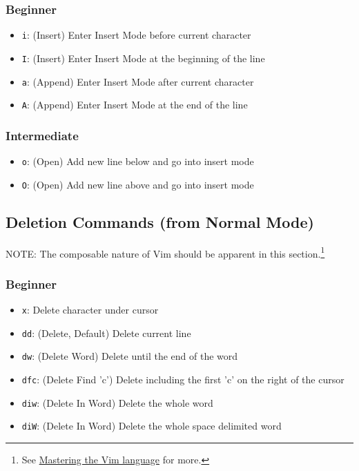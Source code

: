 \documentclass[11pt]{article}
\begin{document}
\subsubsection{Beginner}
\label{sec:org8cca391}
\begin{itemize}
\item \texttt{i}: (Insert) Enter Insert Mode before current character
\item \texttt{I}: (Insert) Enter Insert Mode at the beginning of the line
\item \texttt{a}: (Append) Enter Insert Mode after current character
\item \texttt{A}: (Append) Enter Insert Mode at the end of the line
\end{itemize}
\subsubsection{Intermediate}
\label{sec:orgb60cd62}
\begin{itemize}
\item \texttt{o}: (Open) Add new line below and go into insert mode
\item \texttt{O}: (Open) Add new line above and go into insert mode
\end{itemize}
\subsection{Deletion Commands (from Normal Mode)}
\label{sec:org8563a4f}
NOTE: The composable nature of Vim should be apparent in this section.\footnote{See \href{https://www.youtube.com/watch?v=wlR5gYd6um0}{Mastering the Vim language} for more.} 
\subsubsection{Beginner}
\label{sec:org562ca01}
\begin{itemize}
\item \texttt{x}: Delete character under cursor
\item \texttt{dd}: (Delete, Default) Delete current line
\item \texttt{dw}: (Delete Word) Delete until the end of the word
\item \texttt{dfc}: (Delete Find 'c') Delete including the first 'c' on the right of the cursor
\item \texttt{diw}: (Delete In Word) Delete the whole word
\item \texttt{diW}: (Delete In Word) Delete the whole space delimited word
\end{itemize}
\end{document}
